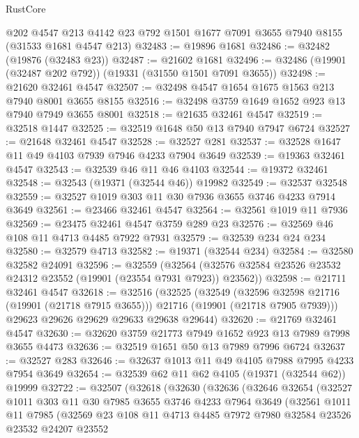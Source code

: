 \begin{lexlean}{RustCore}
\begin{coremodule}
    @202
    @4547
    @213
    @4142
    @23
    @792
    @1501
    @1677
    @7091
    @3655
    @7940
    @8155
    (@31533 @1681 @4547 @213)
@32483 := @19896 @1681
@32486 := @32482 (@19876 (@32483 @23))
@32487 := @21602 @1681
@32496 := @32486 (@19901 (@32487 @202 @792)) (@19331 (@31550 @1501 @7091 @3655))
@32498 := @21620 @32461 @4547
@32507 := @32498 @4547 @1654 @1675 @1563 @213 @7940 @8001 @3655 @8155
@32516 := @32498 @3759 @1649 @1652 @923 @13 @7940 @7949 @3655 @8001
@32518 := @21635 @32461 @4547
@32519 := @32518 @1447
@32525 := @32519 @1648 @50 @13 @7940 @7947 @6724
@32527 := @21648 @32461 @4547
@32528 := @32527 @281
@32537 := @32528 @1647 @11 @49 @4103 @7939 @7946 @4233 @7904 @3649
@32539 := @19363 @32461 @4547
@32543 := @32539 @46 @11 @46 @4103
@32544 := @19372 @32461
@32548 := @32543 (@19371 (@32544 @46)) @19982
@32549 := @32537 @32548
@32559 := @32527 @1019 @303 @11 @30 @7936 @3655 @3746 @4233 @7914 @3649
@32561 := @23466 @32461 @4547
@32564 := @32561 @1019 @11 @7936
@32569 := @23475 @32461 @4547 @3759 @289 @23
@32576 := @32569 @46 @108 @11 @4713 @4485 @7922 @7931
@32579 := @32539 @234 @24 @234
@32580 := @32579 @4713
@32582 := @19371 (@32544 @234)
@32584 := @32580 @32582 @24091
@32596 := @32559
    (@32564 (@32576 @32584 @23526 @23532 @24312 @23552 (@19901 (@23554 @7931 @7923)) @23562))
@32598 := @21711 @32461 @4547
@32618 := @32516
    (@32525
      (@32549
        (@32596 @32598 @21716 (@19901 (@21718 @7915 @3655)))
        @21716
        (@19901 (@21718 @7905 @7939)))
      @29623
      @29626
      @29629
      @29633
      @29638
      @29644)
@32620 := @21769 @32461 @4547
@32630 := @32620 @3759 @21773 @7949 @1652 @923 @13 @7989 @7998 @3655 @4473
@32636 := @32519 @1651 @50 @13 @7989 @7996 @6724
@32637 := @32527 @283
@32646 := @32637 @1013 @11 @49 @4105 @7988 @7995 @4233 @7954 @3649
@32654 := @32539 @62 @11 @62 @4105 (@19371 (@32544 @62)) @19999
@32722 := @32507
    (@32618
      (@32630
        (@32636
          (@32646
            @32654
            (@32527
              @1011
              @303
              @11
              @30
              @7985
              @3655
              @3746
              @4233
              @7964
              @3649
              (@32561
                @1011
                @11
                @7985
                (@32569
                  @23
                  @108
                  @11
                  @4713
                  @4485
                  @7972
                  @7980
                  @32584
                  @23526
                  @23532
                  @24207
                  @23552

\end{coremodule}
\end{lexlean}
